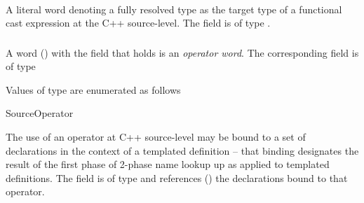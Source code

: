 \paragraph{}  
\label{sec:ifc:SourceLiteral:MsvcCastTargetType}

A literal word denoting a fully resolved type as the target type of a functional
cast expression at the C++ source-level.  The  field is of type
.

\subsubsection{}
\label{sec:ifc:WordSort:Operator}


A word ()  with the  field that holds
 is an \emph{operator word}.  The corresponding 
 field is of type 

Values of type  are enumerated as follows
\begin{Enumeration}{SourceOperator}
\end{Enumeration}

The use of an operator at C++ source-level may be bound to a set of
declarations in the context of a templated definition -- that binding designates
the result of the first phase of 2-phase name lookup up as applied to 
templated definitions.   The  field is of type 
and references () the declarations bound 
to that operator.

